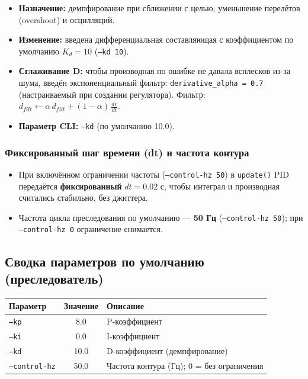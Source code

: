 \documentclass[12pt,a4paper]{article}
\begin{document}
\begin{itemize}[noitemsep]
  \item \textbf{Назначение:} демпфирование при сближении с целью; уменьшение перелётов (overshoot) и осцилляций.
  \item \textbf{Изменение:} введена дифференциальная составляющая с коэффициентом по умолчанию \textbf{$K_d = 10$} (\texttt{--kd 10}).
  \item \textbf{Сглаживание D:} чтобы производная по ошибке не давала всплесков из-за шума, введён экспоненциальный фильтр: \texttt{derivative\_alpha = 0.7} (настраиваемый при создании регулятора). Фильтр: $d_{filt} \leftarrow \alpha\, d_{filt} + (1-\alpha)\, \frac{de}{dt}$.
  \item \textbf{Параметр CLI:} \texttt{--kd} (по умолчанию 10.0).
\end{itemize}

\subsubsection{Фиксированный шаг времени (dt) и частота контура}

\begin{itemize}[noitemsep]
  \item При включённом ограничении частоты (\texttt{--control-hz 50}) в \texttt{update()} PID передаётся \textbf{фиксированный} $dt = 0.02$ с, чтобы интеграл и производная считались стабильно, без джиттера.
  \item Частота цикла преследования по умолчанию --- \textbf{50 Гц} (\texttt{--control-hz 50}); при \texttt{--control-hz 0} ограничение снимается.
\end{itemize}

\subsection{Сводка параметров по умолчанию (преследователь)}

\begin{center}
\begin{tabular}{|l|c|l|}
  \hline
  Параметр & Значение & Описание \\
  \hline
  \texttt{--kp} & 8.0 & P-коэффициент \\
  \texttt{--ki} & 0.0 & I-коэффициент \\
  \texttt{--kd} & 10.0 & D-коэффициент (демпфирование) \\
  \texttt{--control-hz} & 50.0 & Частота контура (Гц); 0 = без ограничения \\
  \hline
\end{tabular}
\end{center}
\end{document}
